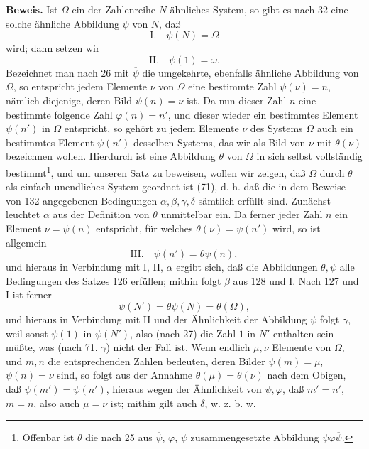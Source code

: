 \documentclass[11pt]{article}
\begin{document}
\noindent\textbf{Beweis.} Ist $\Omega$ ein der Zahlenreihe $N$ ähnliches System, so gibt es nach 32 eine solche ähnliche Abbildung $\psi$ von $N$, daß
\[
\text{I.}\quad \psi(N)=\Omega
\]
wird; dann setzen wir
\[
\text{II.}\quad \psi(1)=\omega.
\]
Bezeichnet man nach 26 mit $\overline{\psi}$ die umgekehrte, ebenfalls ähnliche Abbildung von $\Omega$, so entspricht jedem Elemente $\nu$ von $\Omega$ eine bestimmte Zahl $\overline{\psi}(\nu)=n$, nämlich diejenige, deren Bild $\psi(n)=\nu$ ist. Da nun dieser Zahl $n$ eine bestimmte folgende Zahl $\varphi(n)=n'$, und dieser wieder ein bestimmtes Element $\psi(n')$ in $\Omega$ entspricht, so gehört zu jedem Elemente $\nu$ des Systems $\Omega$ auch ein bestimmtes Element $\psi(n')$ desselben Systems, das wir als Bild von $\nu$ mit $\theta(\nu)$ bezeichnen wollen. Hierdurch ist eine Abbildung $\theta$ von $\Omega$ in sich selbst vollständig bestimmt\footnote{Offenbar ist $\theta$ die nach 25 aus $\overline{\psi}$, $\varphi$, $\psi$ zusammengesetzte Abbildung $\psi\varphi\overline{\psi}$.}, und um unseren Satz zu beweisen, wollen wir zeigen, daß $\Omega$ durch $\theta$ als einfach unendliches System geordnet ist (71), d. h. daß die in dem Beweise von 132 angegebenen Bedingungen $\alpha,\beta,\gamma,\delta$ sämtlich erfüllt sind. Zunächst leuchtet $\alpha$ aus der Definition von $\theta$ unmittelbar ein. Da ferner jeder Zahl $n$ ein Element $\nu=\psi(n)$ entspricht, für welches $\theta(\nu)=\psi(n')$ wird, so ist allgemein
\[
\text{III.}\quad \psi(n')=\theta\psi(n),
\]
und hieraus in Verbindung mit I, II, $\alpha$ ergibt sich, daß die Abbildungen $\theta,\psi$ alle Bedingungen des Satzes 126 erfüllen; mithin folgt $\beta$ aus 128 und I. Nach 127 und I ist ferner
\[
\psi(N')=\theta\psi(N)=\theta(\Omega),
\]
und hieraus in Verbindung mit II und der Ähnlichkeit der Abbildung $\psi$ folgt $\gamma$, weil sonst $\psi(1)$ in $\psi(N')$, also (nach 27) die Zahl $1$ in $N'$ enthalten sein müßte, was (nach 71. $\gamma$) nicht der Fall ist. Wenn endlich $\mu,\nu$ Elemente von $\Omega$, und $m,n$ die entsprechenden Zahlen bedeuten, deren Bilder $\psi(m)=\mu$, $\psi(n)=\nu$ sind, so folgt aus der Annahme $\theta(\mu)=\theta(\nu)$ nach dem Obigen, daß $\psi(m')=\psi(n')$, hieraus wegen der Ähnlichkeit von $\psi,\varphi$, daß $m'=n'$, $m=n$, also auch $\mu=\nu$ ist; mithin gilt auch $\delta$, w. z. b. w.
\end{document}
